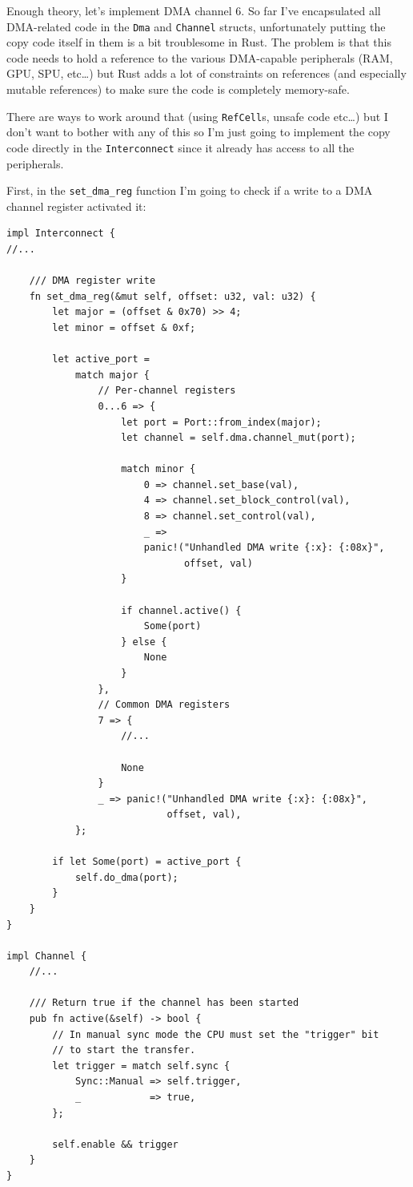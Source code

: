 \documentclass[a4paper]{article}
\newcommand{\code}[1] {\texttt{#1}}
\begin{document}
Enough theory, let's implement DMA channel 6. So far I've encapsulated
all DMA-related code in the \code{Dma} and \code{Channel} structs,
unfortunately putting the copy code itself in them is a bit
troublesome in Rust. The problem is that this code needs to hold a
reference to the various DMA-capable peripherals (RAM, GPU, SPU,
etc\dots{}) but Rust adds a lot of constraints on references (and
especially mutable references) to make sure the code is completely
memory-safe.

There are ways to work around that (using \code{RefCell}s, unsafe code
etc\dots{}) but I don't want to bother with any of this so I'm just going
to implement the copy code directly in the \code{Interconnect} since it
already has access to all the peripherals.

First, in the \code{set\_dma\_reg} function I'm going to check if a
write to a DMA channel register activated it:

\begin{lstlisting}
impl Interconnect {
//...

    /// DMA register write
    fn set_dma_reg(&mut self, offset: u32, val: u32) {
        let major = (offset & 0x70) >> 4;
        let minor = offset & 0xf;

        let active_port =
            match major {
                // Per-channel registers
                0...6 => {
                    let port = Port::from_index(major);
                    let channel = self.dma.channel_mut(port);

                    match minor {
                        0 => channel.set_base(val),
                        4 => channel.set_block_control(val),
                        8 => channel.set_control(val),
                        _ =>
                        panic!("Unhandled DMA write {:x}: {:08x}",
                               offset, val)
                    }

                    if channel.active() {
                        Some(port)
                    } else {
                        None
                    }
                },
                // Common DMA registers
                7 => {
                    //...

                    None
                }
                _ => panic!("Unhandled DMA write {:x}: {:08x}",
                            offset, val),
            };

        if let Some(port) = active_port {
            self.do_dma(port);
        }
    }
}

impl Channel {
    //...

    /// Return true if the channel has been started
    pub fn active(&self) -> bool {
        // In manual sync mode the CPU must set the "trigger" bit
        // to start the transfer.
        let trigger = match self.sync {
            Sync::Manual => self.trigger,
            _            => true,
        };

        self.enable && trigger
    }
}
\end{lstlisting}
\end{document}
